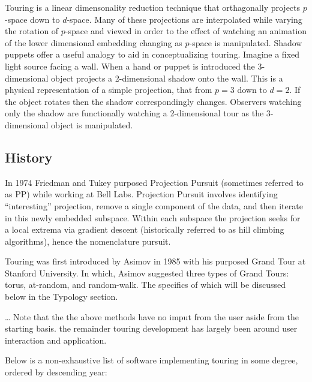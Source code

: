 \documentclass{monashthesis}
\begin{document}
Touring is a linear dimensonality reduction technique that orthagonally
projects \(p\)-space down to \(d\)-space. Many of these projections are
interpolated while varying the rotation of \(p\)-space and viewed in
order to the effect of watching an animation of the lower dimensional
embedding changing as \(p\)-space is manipulated. Shadow puppets offer a
useful analogy to aid in conceptualizing touring. Imagine a fixed light
source facing a wall. When a hand or puppet is introduced the
3-dimensional object projects a 2-dimensional shadow onto the wall. This
is a physical representation of a simple projection, that from \(p=3\)
down to \(d=2\). If the object rotates then the shadow correspondingly
changes. Observers watching only the shadow are functionally watching a
2-dimensional tour as the 3-dimensional object is manipulated.

\subsection{History}\label{history}

In 1974 Friedman and Tukey purposed Projection
Pursuit\autocite{friedman_projection_1974} (sometimes referred to as PP)
while working at Bell Labs. Projection Pursuit involves identifying
``interesting'' projection, remove a single component of the data, and
then iterate in this newly embedded subspace. Within each subspace the
projection seeks for a local extrema via gradient descent (historically
referred to as hill climbing algorithms), hence the nomenclature
pursuit.

Touring was first introduced by Asimov in 1985 with his purposed Grand
Tour\autocite{asimov_grand_1985} at Stanford University. In which,
Asimov suggested three types of Grand Tours: torus, at-random, and
random-walk. The specifics of which will be discussed below in the
Typology section.

\ldots{} Note that the the above methods have no imput from the user
aside from the starting basis. the remainder touring development has
largely been around user interaction and application.

Below is a non-exhaustive list of software implementing touring in some
degree, ordered by descending year:
\end{document}
